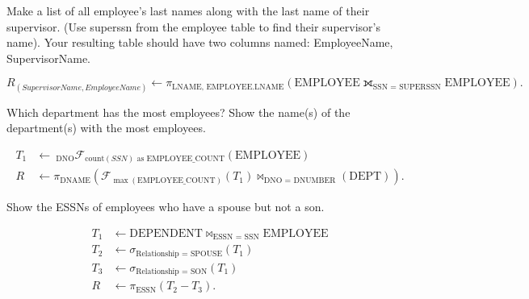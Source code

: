 \documentclass[
  coursecode={CMPE 332},
  assignmentname={Relational Algebra Assignment},
  studentnumber=20053722,
  name={Bryan Hoang},
  draft,
]{
  ltxanswer%
}
\begin{document}
\begin{questions}
    \question[2] Make a list of all employee's last names along with the last name of their supervisor.  (Use superssn from the employee table to find their supervisor's name).  Your resulting table should have two columns named: EmployeeName, SupervisorName.
    \begin{solution}
      \begin{equation*}
        R_{(SupervisorName, EmployeeName)} \leftarrow \pi_{\text{LNAME, EMPLOYEE.LNAME}}(\text{EMPLOYEE} \fullouterjoin_{\text{SSN = SUPERSSN}} \text{EMPLOYEE}).
      \end{equation*}
    \end{solution}

    \question[2] Which department has the most employees?  Show the name(s) of the department(s) with the most employees.
    \begin{solution}
      \begin{align*}
        T_{1} &\leftarrow \ _{\text{DNO}}\mathcal{F}_{\mathrm{count}(SSN)\text{ as EMPLOYEE\_COUNT}}(\text{EMPLOYEE})                        \\
        R     &\leftarrow \pi_{\text{DNAME}}(\mathcal{F}_{\max(\text{EMPLOYEE\_COUNT})}(T_{1}) \bowtie_{\text{DNO = DNUMBER}}(\text{DEPT})).
      \end{align*}
    \end{solution}

    \question[2] Show the ESSNs of employees who have a spouse but not a son.
    \begin{solution}
      \begin{align*}
        T_{1} &\leftarrow \text{DEPENDENT} \bowtie_{\text{ESSN = SSN}} \text{EMPLOYEE} \\
        T_{2} &\leftarrow \sigma_{\text{Relationship = SPOUSE}}(T_{1})                 \\
        T_{3} &\leftarrow \sigma_{\text{Relationship = SON}}(T_{1})                    \\
        R     &\leftarrow \pi_{\text{ESSN}}(T_{2} - T_{3}).
      \end{align*}
    \end{solution}
  \end{questions}
\end{document}
